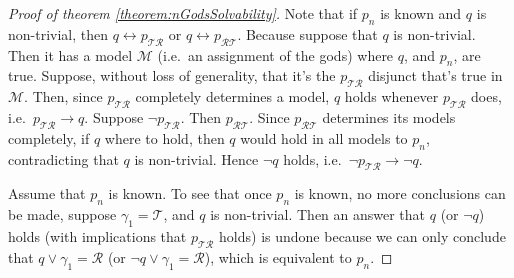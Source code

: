 \documentclass[10pt,a4paper]{amsart}
\begin{document}
\begin{proof}[Proof of theorem \ref{theorem:nGodsSolvability}]

Note that
if $p_n$ 
is known
and $q$ is non-trivial, then
$q\leftrightarrow p_{\mathcal{\scriptscriptstyle T}\mathcal{\scriptscriptstyle R}}$ or
$q\leftrightarrow p_{\mathcal{\scriptscriptstyle R}\mathcal{\scriptscriptstyle T}}$.
Because suppose 
that $q$ is non-trivial. Then it has a model $\mathcal{M}$ (i.e.\ an assignment of the gods)
where $q$, and $p_n$, are true. Suppose, without loss of generality, that it's 
the $p_{\mathcal{\scriptscriptstyle T}\mathcal{\scriptscriptstyle R}}$
disjunct that's true in $\mathcal{M}$.
Then, since $p_{\mathcal{\scriptscriptstyle T}\mathcal{\scriptscriptstyle R}}$
completely determines a model, $q$ holds whenever 
$p_{\mathcal{\scriptscriptstyle T}\mathcal{\scriptscriptstyle R}}$ does, i.e.\
$p_{\mathcal{\scriptscriptstyle T}\mathcal{\scriptscriptstyle R}}\rightarrow q$.
Suppose $\neg p_{\mathcal{\scriptscriptstyle T}\mathcal{\scriptscriptstyle R}}$.
Then $p_{\mathcal{\scriptscriptstyle R}\mathcal{\scriptscriptstyle T}}$.
Since $p_{\mathcal{\scriptscriptstyle R}\mathcal{\scriptscriptstyle T}}$
determines its models completely, if $q$ where to hold, then $q$ would
hold in all models to $p_n$, contradicting that $q$ is non-trivial.
Hence $\neg q$ holds, i.e.\ 
$\neg p_{\mathcal{\scriptscriptstyle T}\mathcal{\scriptscriptstyle R}}\rightarrow \neg q$.


Assume that $p_n$ is known.
To see that once $p_n$ is known, no more conclusions can be made, 
suppose $\gamma_1\!=\!\mathcal{T}$, 
and $q$ is non-trivial.
Then an answer that $q$ (or $\neg q$) holds 
(with implications that 
$p_{\mathcal{\scriptscriptstyle T}\mathcal{\scriptscriptstyle R}}$ holds)
is undone because we can only conclude that
$q \vee \gamma_1\!=\!\mathcal{R}$ (or $\neg q \vee \gamma_1\!=\!\mathcal{R}$),
which is equivalent to $p_n$.


\end{proof}
\end{document}
